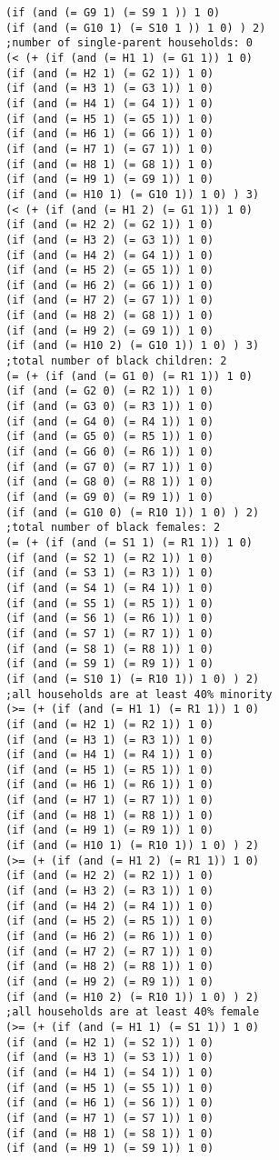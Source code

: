 \documentclass[runningheads]{llncs}
\begin{document}
\begin{verbatim}
(if (and (= G9 1) (= S9 1 )) 1 0)
(if (and (= G10 1) (= S10 1 )) 1 0) ) 2)
;number of single-parent households: 0
(< (+ (if (and (= H1 1) (= G1 1)) 1 0)
(if (and (= H2 1) (= G2 1)) 1 0)
(if (and (= H3 1) (= G3 1)) 1 0)
(if (and (= H4 1) (= G4 1)) 1 0)
(if (and (= H5 1) (= G5 1)) 1 0)
(if (and (= H6 1) (= G6 1)) 1 0)
(if (and (= H7 1) (= G7 1)) 1 0)
(if (and (= H8 1) (= G8 1)) 1 0)
(if (and (= H9 1) (= G9 1)) 1 0)
(if (and (= H10 1) (= G10 1)) 1 0) ) 3)
(< (+ (if (and (= H1 2) (= G1 1)) 1 0)
(if (and (= H2 2) (= G2 1)) 1 0)
(if (and (= H3 2) (= G3 1)) 1 0)
(if (and (= H4 2) (= G4 1)) 1 0)
(if (and (= H5 2) (= G5 1)) 1 0)
(if (and (= H6 2) (= G6 1)) 1 0)
(if (and (= H7 2) (= G7 1)) 1 0)
(if (and (= H8 2) (= G8 1)) 1 0)
(if (and (= H9 2) (= G9 1)) 1 0)
(if (and (= H10 2) (= G10 1)) 1 0) ) 3)
;total number of black children: 2
(= (+ (if (and (= G1 0) (= R1 1)) 1 0)
(if (and (= G2 0) (= R2 1)) 1 0)
(if (and (= G3 0) (= R3 1)) 1 0)
(if (and (= G4 0) (= R4 1)) 1 0)
(if (and (= G5 0) (= R5 1)) 1 0)
(if (and (= G6 0) (= R6 1)) 1 0)
(if (and (= G7 0) (= R7 1)) 1 0)
(if (and (= G8 0) (= R8 1)) 1 0)
(if (and (= G9 0) (= R9 1)) 1 0)
(if (and (= G10 0) (= R10 1)) 1 0) ) 2)
;total number of black females: 2
(= (+ (if (and (= S1 1) (= R1 1)) 1 0)
(if (and (= S2 1) (= R2 1)) 1 0)
(if (and (= S3 1) (= R3 1)) 1 0)
(if (and (= S4 1) (= R4 1)) 1 0)
(if (and (= S5 1) (= R5 1)) 1 0)
(if (and (= S6 1) (= R6 1)) 1 0)
(if (and (= S7 1) (= R7 1)) 1 0)
(if (and (= S8 1) (= R8 1)) 1 0)
(if (and (= S9 1) (= R9 1)) 1 0)
(if (and (= S10 1) (= R10 1)) 1 0) ) 2)
;all households are at least 40% minority
(>= (+ (if (and (= H1 1) (= R1 1)) 1 0)
(if (and (= H2 1) (= R2 1)) 1 0)
(if (and (= H3 1) (= R3 1)) 1 0)
(if (and (= H4 1) (= R4 1)) 1 0)
(if (and (= H5 1) (= R5 1)) 1 0)
(if (and (= H6 1) (= R6 1)) 1 0)
(if (and (= H7 1) (= R7 1)) 1 0)
(if (and (= H8 1) (= R8 1)) 1 0)
(if (and (= H9 1) (= R9 1)) 1 0)
(if (and (= H10 1) (= R10 1)) 1 0) ) 2)
(>= (+ (if (and (= H1 2) (= R1 1)) 1 0)
(if (and (= H2 2) (= R2 1)) 1 0)
(if (and (= H3 2) (= R3 1)) 1 0)
(if (and (= H4 2) (= R4 1)) 1 0)
(if (and (= H5 2) (= R5 1)) 1 0)
(if (and (= H6 2) (= R6 1)) 1 0)
(if (and (= H7 2) (= R7 1)) 1 0)
(if (and (= H8 2) (= R8 1)) 1 0)
(if (and (= H9 2) (= R9 1)) 1 0)
(if (and (= H10 2) (= R10 1)) 1 0) ) 2)
;all households are at least 40% female
(>= (+ (if (and (= H1 1) (= S1 1)) 1 0)
(if (and (= H2 1) (= S2 1)) 1 0)
(if (and (= H3 1) (= S3 1)) 1 0)
(if (and (= H4 1) (= S4 1)) 1 0)
(if (and (= H5 1) (= S5 1)) 1 0)
(if (and (= H6 1) (= S6 1)) 1 0)
(if (and (= H7 1) (= S7 1)) 1 0)
(if (and (= H8 1) (= S8 1)) 1 0)
(if (and (= H9 1) (= S9 1)) 1 0)

\end{verbatim}
\end{document}
